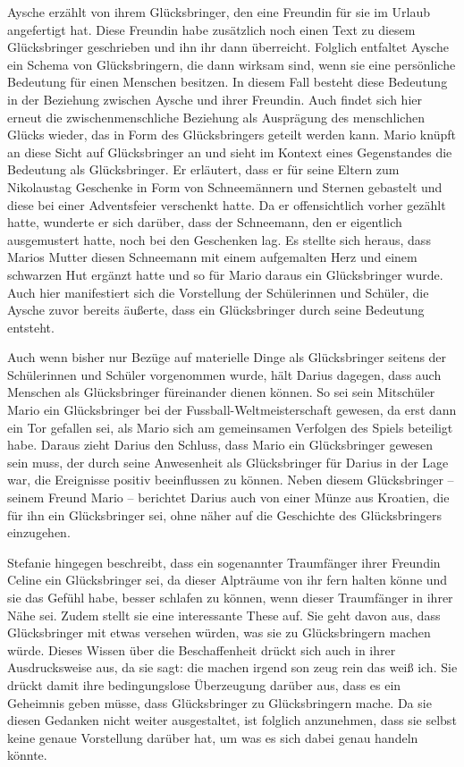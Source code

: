 Aysche erzählt von ihrem Glücksbringer, den eine Freundin für sie im Urlaub angefertigt hat. 
Diese Freundin habe zusätzlich noch einen Text zu diesem Glücksbringer geschrieben und ihn ihr dann überreicht. 
Folglich entfaltet Aysche ein Schema von Glücksbringern, die dann wirksam sind, wenn sie eine persönliche Bedeutung für einen Menschen besitzen. 
In diesem Fall besteht diese Bedeutung in der Beziehung zwischen Aysche und ihrer Freundin. 
Auch findet sich hier erneut die zwischenmenschliche Beziehung als Ausprägung des menschlichen Glücks wieder, das in Form des Glücksbringers geteilt werden kann. 
Mario knüpft an diese Sicht auf Glücksbringer an und sieht im Kontext eines Gegenstandes die Bedeutung als Glücksbringer.
Er erläutert, dass er für seine Eltern zum Nikolaustag Geschenke in Form von Schneemännern und Sternen gebastelt und diese bei einer Adventsfeier verschenkt hatte. 
Da er offensichtlich vorher gezählt hatte, wunderte er sich darüber, dass der Schneemann, den er eigentlich ausgemustert hatte, noch bei den Geschenken lag. 
Es stellte sich heraus, dass Marios Mutter diesen Schneemann mit einem aufgemalten Herz und einem schwarzen Hut ergänzt hatte und so für Mario daraus ein Glücksbringer wurde. 
Auch hier manifestiert sich die Vorstellung der Schülerinnen und Schüler, die Aysche zuvor bereits äußerte, dass ein Glücksbringer durch seine Bedeutung entsteht.
	
Auch wenn bisher nur Bezüge auf materielle Dinge als Glücksbringer seitens der Schülerinnen und Schüler vorgenommen wurde, hält Darius dagegen, dass auch Menschen als Glücksbringer füreinander dienen können. 
So sei sein Mitschüler Mario ein Glücksbringer bei der Fussball-Weltmeisterschaft gewesen, da erst dann ein Tor gefallen sei, als Mario sich am gemeinsamen Verfolgen des Spiels beteiligt habe. 
Daraus zieht Darius den Schluss, dass Mario ein Glücksbringer gewesen sein muss, der durch seine Anwesenheit als Glücksbringer für Darius in der Lage war, die Ereignisse positiv beeinflussen zu können. 
Neben diesem Glücksbringer -- seinem Freund Mario -- berichtet Darius auch von einer Münze aus Kroatien, die für ihn ein Glücksbringer sei, ohne näher auf die Geschichte des Glücksbringers einzugehen. 

Stefanie hingegen beschreibt, dass ein sogenannter Traumfänger ihrer Freundin Celine ein Glücksbringer sei, da dieser Alpträume von ihr fern halten könne und sie das Gefühl habe, besser schlafen zu können, wenn dieser Traumfänger in ihrer Nähe sei. 
Zudem stellt sie eine interessante These auf. 
Sie geht davon aus, dass Glücksbringer mit etwas versehen würden, was sie zu Glücksbringern machen würde.
Dieses Wissen über die Beschaffenheit drückt sich auch in ihrer Ausdrucksweise aus, da sie sagt: \glqq die machen irgend son zeug rein das weiß ich.\grqq{} 
Sie drückt damit ihre bedingungslose Überzeugung darüber aus, dass es ein Geheimnis geben müsse, dass Glücksbringer zu Glücksbringern mache. 
Da sie diesen Gedanken nicht weiter ausgestaltet, ist folglich anzunehmen, dass sie selbst keine genaue Vorstellung darüber hat, um was es sich dabei genau handeln könnte. 

